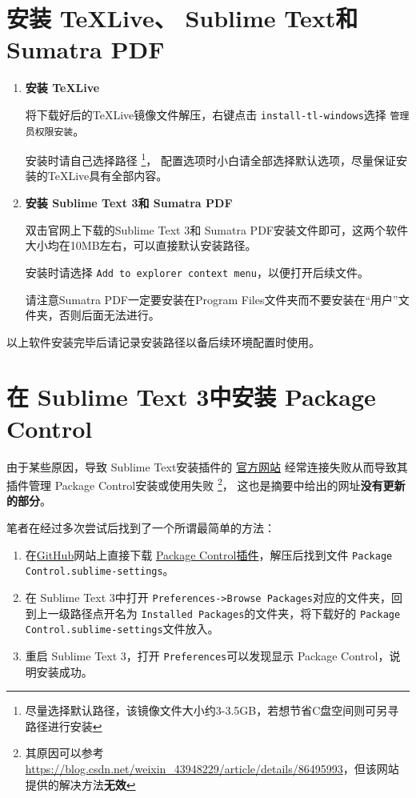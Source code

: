 \documentclass{ctexart}
\begin{document}
\section{安装 TeXLive、 Sublime Text和 Sumatra PDF}
% 
\begin{enumerate}[leftmargin=*]
\item[(a)]
\textbf{安装 TeXLive}

将下载好后的TeXLive镜像文件解压，右键点击 \texttt{install-tl-windows}选择 \texttt{管理员权限安装}。

安装时请自己选择路径
\footnote{尽量选择默认路径，该镜像文件大小约3-3.5GB，若想节省C盘空间则可另寻路径进行安装}，
配置选项时小白请全部选择默认选项，尽量保证安装的TeXLive具有全部内容。
% 
\item[(b)]
\textbf{安装 Sublime Text 3和 Sumatra PDF}

双击官网上下载的Sublime Text 3和 Sumatra PDF安装文件即可，这两个软件大小均在10MB左右，可以直接默认安装路径。

安装时请选择 \texttt{Add to explorer context menu}，以便打开后续文件。

请注意Sumatra PDF一定要安装在Program Files文件夹而不要安装在“用户”文件夹，否则后面无法进行。
\end{enumerate}

以上软件安装完毕后请记录安装路径以备后续环境配置时使用。
% 
\section{在 Sublime Text 3中安装 Package Control}
% 
由于某些原因，导致 Sublime Text安装插件的 
\href{https://packagecontrol.io/}{官方网站}
经常连接失败从而导致其插件管理 Package Control安装或使用失败
\footnote{其原因可以参考 \url{https://blog.csdn.net/weixin_43948229/article/details/86495993}，但该网站提供的解决方法\textbf{无效}}，
这也是摘要中给出的网址\textbf{没有更新的部分}。

笔者在经过多次尝试后找到了一个所谓最简单的方法：
\begin{enumerate}[leftmargin=*]
\item[(1)]
在\href{https://github.com/}{GitHub}网站上直接下载 \href{https://github.com/wbond/package_control}{Package Control插件}，解压后找到文件 \texttt{Package Control.sublime-settings}。
% 
\item[(2)]
在 Sublime Text 3中打开 \texttt{Preferences->Browse Packages}对应的文件夹，回到上一级路径点开名为 \texttt{Installed Packages}的文件夹，将下载好的 \texttt{Package Control.sublime-settings}文件放入。
% 
\item[(3)]
重启 Sublime Text 3，打开 \texttt{Preferences}可以发现显示 Package Control，说明安装成功。
\end{enumerate}
% 
\end{document}
